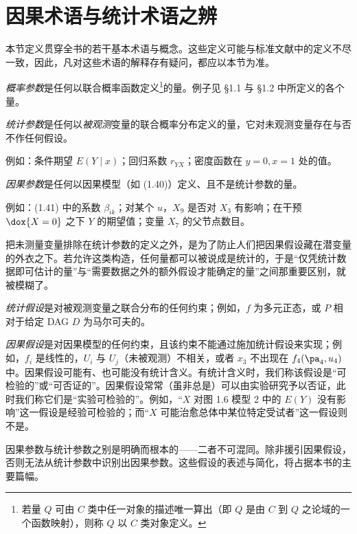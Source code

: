 \section{因果术语与统计术语之辨}

本节定义贯穿全书的若干基本术语与概念。这些定义可能与标准文献中的定义不尽一致，因此，凡对这些术语的解释存有疑问，都应以本节为准。

\emph{概率参数}是任何以联合概率函数定义\footnote{若量 $Q$ 可由 $C$ 类中任一对象的描述唯一算出（即 $Q$ 是由 $C$ 到 $Q$ 之论域的一个函数映射），则称 $Q$ 以 $C$ 类对象定义。}的量。例子见 \S 1.1 与 \S 1.2 中所定义的各个量。

\emph{统计参数}是任何以\emph{被观测}变量的联合概率分布定义的量，它对未观测变量存在与否不作任何假设。

\noindent 例如：条件期望 $E(Y\mid x)$；回归系数 $r_{YX}$；密度函数在 $y=0,x=1$ 处的值。

\emph{因果参数}是任何以因果模型（如 \textup{(1.40)}）定义、且不是统计参数的量。

\noindent 例如：\textup{(1.41)} 中的系数 $\beta_{ik}$；对某个 $u$，$X_9$ 是否对 $X_3$ 有影响；在干预 $\dox{X=0}$ 之下 $Y$ 的期望值；变量 $X_7$ 的父节点数目。

\begin{remarkenv}
把未测量变量排除在统计参数的定义之外，是为了防止人们把因果假设藏在潜变量的外衣之下。若允许这类构造，任何量都可以被说成是统计的，于是“仅凭统计数据即可估计的量”与“需要数据之外的额外假设才能确定的量”之间那重要区别，就被模糊了。
\end{remarkenv}

\emph{统计假设}是对被观测变量之联合分布的任何约束；例如，$f$ 为多元正态，或 $P$ 相对于给定 DAG $D$ 为马尔可夫的。

\emph{因果假设}是对因果模型的任何约束，且该约束不能通过施加统计假设来实现；例如，$f_i$ 是线性的，$U_i$ 与 $U_j$（未被观测）不相关，或者 $x_3$ 不出现在 $f_4(\pa_4,u_4)$ 中。因果假设可能有、也可能没有统计含义。有统计含义时，我们称该假设是“可检验的”或“可否证的”。因果假设常常（虽非总是）可以由实验研究予以否证，此时我们称它们是“实验可检验的”。例如，“$X$ 对图 1.6 模型 2 中的 $E(Y)$ 没有影响”这一假设是经验可检验的；而“$X$ 可能治愈总体中某位特定受试者”这一假设则不是。

\begin{remarkenv}
因果参数与统计参数之别是明确而根本的——二者不可混同。除非援引因果假设，否则无法从统计参数中识别出因果参数。这些假设的表述与简化，将占据本书的主要篇幅。
\end{remarkenv}


